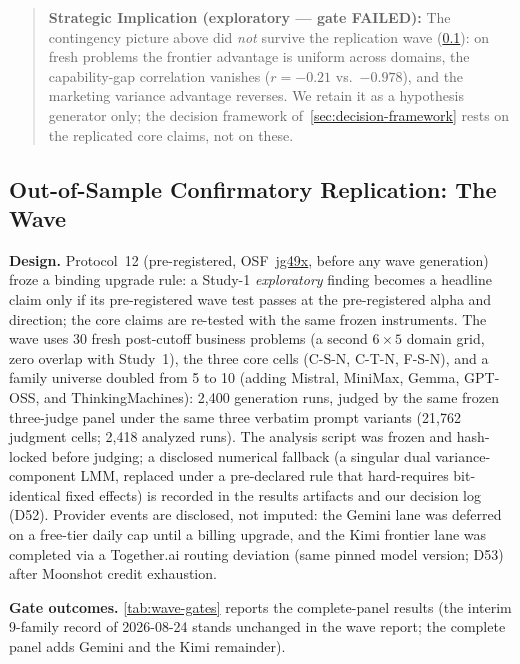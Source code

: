 \documentclass[12pt,a4paper]{article}
\begin{document}
\begin{quote}
\textbf{Strategic Implication (exploratory --- gate FAILED):} The contingency
picture above did \emph{not} survive the replication wave
(\cref{sec:wave}): on fresh problems the frontier advantage is uniform across
domains, the capability-gap correlation vanishes ($r = -0.21$ vs.\
$-0.978$), and the marketing variance advantage reverses. We retain it as a
hypothesis generator only; the decision framework
of~\cref{sec:decision-framework} rests on the replicated core claims, not on
these.
\end{quote}

\subsection{Out-of-Sample Confirmatory Replication: The Wave}\label{sec:wave}

\textbf{Design.} Protocol~12 (pre-registered, OSF~\href{https://osf.io/jg49x}{jg49x},
before any wave generation) froze a binding upgrade rule: a Study-1
\emph{exploratory} finding becomes a headline claim only if its pre-registered
wave test passes at the pre-registered alpha and direction; the core claims are
re-tested with the same frozen instruments. The wave uses 30 fresh post-cutoff
business problems (a second $6 \times 5$ domain grid, zero overlap with
Study~1), the three core cells (C-S-N, C-T-N, F-S-N), and a family universe
doubled from 5 to 10 (adding Mistral, MiniMax, Gemma, GPT-OSS, and
ThinkingMachines): 2{,}400 generation runs, judged by the same frozen
three-judge panel under the same three verbatim prompt variants
(21{,}762 judgment cells; 2{,}418 analyzed runs). The analysis script was
frozen and hash-locked before judging; a disclosed numerical fallback (a
singular dual variance-component LMM, replaced under a pre-declared rule that
hard-requires bit-identical fixed effects) is recorded in the results artifacts
and our decision log (D52). Provider events are disclosed, not imputed: the
Gemini lane was deferred on a free-tier daily cap until a billing upgrade, and
the Kimi frontier lane was completed via a Together.ai routing deviation
(same pinned model version; D53) after Moonshot credit exhaustion.

\textbf{Gate outcomes.} \cref{tab:wave-gates} reports the complete-panel
results (the interim 9-family record of 2026-08-24 stands unchanged in the
wave report; the complete panel adds Gemini and the Kimi remainder).
\end{document}
